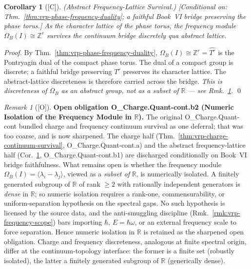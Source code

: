 \documentclass[12pt,oneside]{amsbook}
\theoremstyle{plain}
\newtheorem{corollary}[theorem]{Corollary}
\theoremstyle{definition}
\theoremstyle{remark}
\newtheorem{remark}[theorem]{Remark}
\newcommand{\status}[1]{\textup{[#1]}}
\begin{document}
\begin{corollary}[\status{C}]\label{cor:vrp-frequency-lattice-survival}
\textup{(Abstract Frequency-Lattice Survival.)}
\textup{[Conditional on: Thm.~\ref{thm:vrp-phase-frequency-duality};
a faithful Book~VI bridge preserving the phase torus.]}
As the character lattice of the phase torus, the frequency module
$\Omega_B(I) \cong \mathbb{Z}^r$ survives the continuum bridge discretely
\emph{qua abstract lattice}.
\end{corollary}

\begin{proof}
By Thm.~\ref{thm:vrp-phase-frequency-duality},
$\Omega_B(I) \cong \mathbb{Z}^r = \widehat{T^r}$ is the Pontryagin dual of
the compact phase torus. The dual of a compact group is discrete; a
faithful bridge preserving $T^r$ preserves its character lattice. The
abstract-lattice discreteness is therefore carried across the bridge.
\emph{This is discreteness of $\Omega_B$ as an abstract group, not as a
subset of $\mathbb{R}$ --- see Rmk.~\ref{ob:vrp-charge-quant}.} \qed
\end{proof}

\begin{remark}[\status{O}]\label{ob:vrp-charge-quant}
\textbf{Open obligation O\_Charge.Quant-cont.b2 (Numeric Isolation of the
Frequency Module in $\mathbb{R}$).} The original O\_Charge.Quant-cont
bundled charge and frequency continuum survival as one deferral; that was
too coarse, and is now sharpened. The charge half
(Thm.~\ref{thm:vrp-charge-continuum-survival}, O\_Charge.Quant-cont.a) and
the abstract frequency-lattice half
(Cor.~\ref{cor:vrp-frequency-lattice-survival},
O\_Charge.Quant-cont.b1) are discharged conditionally on Book~VI bridge
faithfulness. What remains open is whether the frequency module
$\Omega_B(I) = \langle \lambda_i - \lambda_j \rangle$, viewed as a
\emph{subset of} $\mathbb{R}$, is numerically isolated. A finitely
generated subgroup of $\mathbb{R}$ of rank $\geq 2$ with rationally
independent generators is \emph{dense} in $\mathbb{R}$; so numeric
isolation requires a rank-one, commensurability, or uniform-separation
hypothesis on the spectral gaps. No such hypothesis is licensed by the
source data, and the anti-smuggling discipline
(Rmk.~\ref{rmk:vrp-frequency-scope}) bars importing $\hbar$, $E=\hbar\omega$,
or an external frequency scale to force separation. Hence numeric
isolation in $\mathbb{R}$ is retained as the sharpened open obligation.
Charge and frequency discreteness, analogous at finite spectral origin,
differ at the continuum-topology interface: the former is a finite set
(robustly isolated), the latter a finitely generated subgroup of
$\mathbb{R}$ (generically dense). \end{remark}
\end{document}
